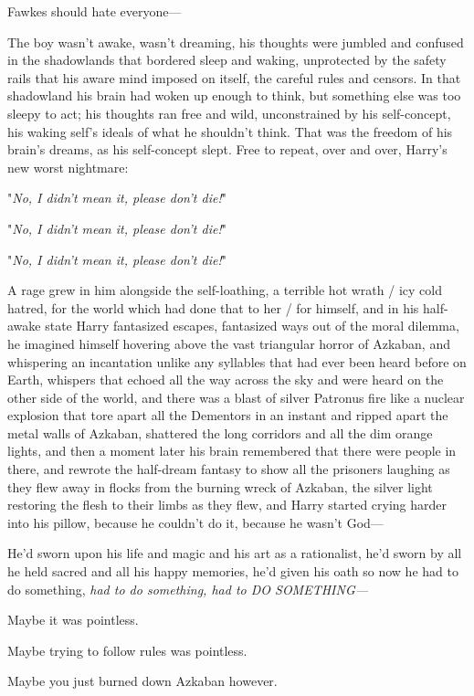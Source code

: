 Fawkes should hate everyone---

The boy wasn't awake, wasn't dreaming, his thoughts were jumbled and confused 
in the shadowlands that bordered sleep and waking, unprotected by the safety 
rails that his aware mind imposed on itself, the careful rules and censors. In 
that shadowland his brain had woken up enough to think, but something else was 
too sleepy to act; his thoughts ran free and wild, unconstrained by his 
self-concept, his waking self's ideals of what he shouldn't think. That was the 
freedom of his brain's dreams, as his self-concept slept. Free to repeat, over 
and over, Harry's new worst nightmare:

"\emph{No, I didn't mean it, please don't die!}"

"\emph{No, I didn't mean it, please don't die!}"

"\emph{No, I didn't mean it, please don't die!}"

A rage grew in him alongside the self-loathing, a terrible hot wrath / icy cold 
hatred, for the world which had done that to her / for himself, and in his 
half-awake state Harry fantasized escapes, fantasized ways out of the moral 
dilemma, he imagined himself hovering above the vast triangular horror of 
Azkaban, and whispering an incantation unlike any syllables that had ever been 
heard before on Earth, whispers that echoed all the way across the sky and were 
heard on the other side of the world, and there was a blast of silver Patronus 
fire like a nuclear explosion that tore apart all the Dementors in an instant 
and ripped apart the metal walls of Azkaban, shattered the long corridors and 
all the dim orange lights, and then a moment later his brain remembered that 
there were people in there, and rewrote the half-dream fantasy to show all the 
prisoners laughing as they flew away in flocks from the burning wreck of 
Azkaban, the silver light restoring the flesh to their limbs as they flew, and 
Harry started crying harder into his pillow, because he couldn't do it, because 
he wasn't God---

He'd sworn upon his life and magic and his art as a rationalist, he'd sworn by 
all he held sacred and all his happy memories, he'd given his oath so now he 
had to do something, \emph{had to do something, had to DO SOMETHING---}

Maybe it was pointless.

Maybe trying to follow rules was pointless.

Maybe you just burned down Azkaban however.

